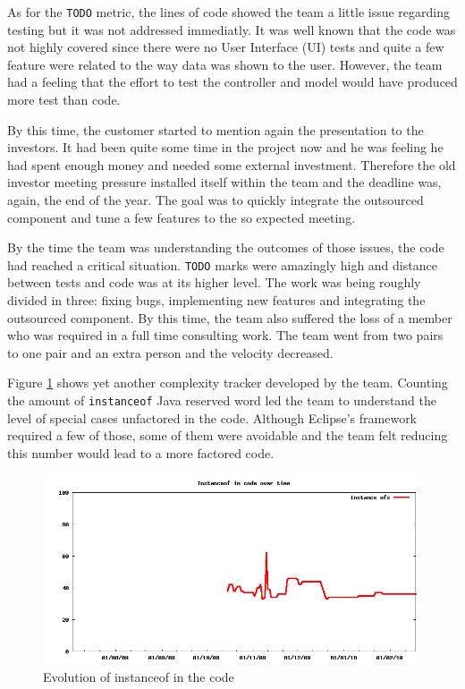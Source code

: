 \documentclass[lnbip]{svmultln}
\begin{document}
As for the \texttt{TODO} metric, the lines of code showed the team a
little issue regarding testing but it was not addressed immediatly. It
was well known that the code was not highly covered since there were
no User Interface (UI) tests and quite a few feature were related to
the way data was shown to the user. However, the team had a feeling
that the effort to test the controller and model would have produced
more test than code.

By this time, the customer started to mention again the presentation
to the investors. It had been quite some time in the project now and
he was feeling he had spent enough money and needed some external
investment. Therefore the old investor meeting pressure installed
itself within the team and the deadline was, again, the end of the
year. The goal was to quickly integrate the outsourced component and
tune a few features to the so expected meeting.

By the time the team was understanding the outcomes of those issues,
the code had reached a critical situation. \texttt{TODO} marks were
amazingly high and distance between tests and code was at its higher
level. The work was being roughly divided in three: fixing bugs,
implementing new features and integrating the outsourced component. By
this time, the team also suffered the loss of a member who was
required in a full time consulting work. The team went from two pairs
to one pair and an extra person and the velocity decreased.

Figure \ref{fig:InstanceOfs} shows yet another complexity tracker
developed by the team. Counting the amount of \texttt{instanceof} Java
reserved word led the team to understand the level of special cases
unfactored in the code. Although Eclipse's framework required a few of
those, some of them were avoidable and the team felt reducing this
number would lead to a more factored code.

\begin{figure}[hbt]
  \centerline{
    \includegraphics[width=120mm]{InstanceOfs.png}
  }
  \caption{Evolution of instanceof in the code }
  \label{fig:InstanceOfs}
\end{figure}
\end{document}
